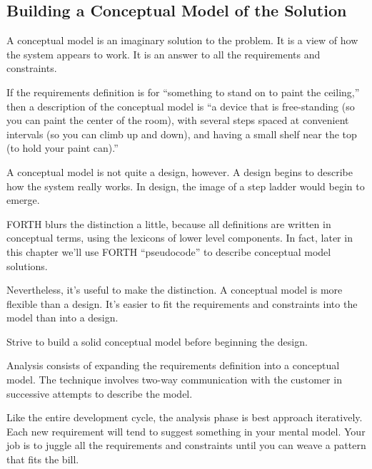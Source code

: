 \subsection{Building a Conceptual Model of the Solution}

\noindent A conceptual model is an imaginary solution to the problem. It is a view
of how the system appears to work. It is an answer to all the
requirements and constraints.

If the requirements definition is for ``something to stand on to paint
the ceiling,'' then a description of the conceptual model is ``a device that
is free-standing (so you can paint the center of the room), with several
steps spaced at convenient intervals (so you can climb up and down), and
having a small shelf near the top (to hold your paint can).''

A conceptual model is not quite a design, however. A design begins
to describe how the system really works. In design, the image of a step
ladder would begin to emerge.

FORTH blurs the distinction a little, because all definitions are
written in conceptual terms, using the lexicons of lower level
components. In fact, later in this chapter we'll use FORTH ``pseudocode'' to
describe conceptual model solutions.

Nevertheless, it's useful to make the distinction. A conceptual
model is more flexible than a design. It's easier to fit the requirements
and constraints into the model than into a design.

\begin{tip}
Strive to build a solid conceptual model before beginning the design.
\end{tip}




\noindent Analysis consists of expanding the requirements definition into a
conceptual model. The technique involves two-way communication with the
customer in successive attempts to describe the model.

Like the entire development cycle, the analysis phase is best
approach iteratively. Each new requirement will tend to suggest something
in your mental model. Your job is to juggle all the requirements and
constraints until you can weave a pattern that fits the bill.

